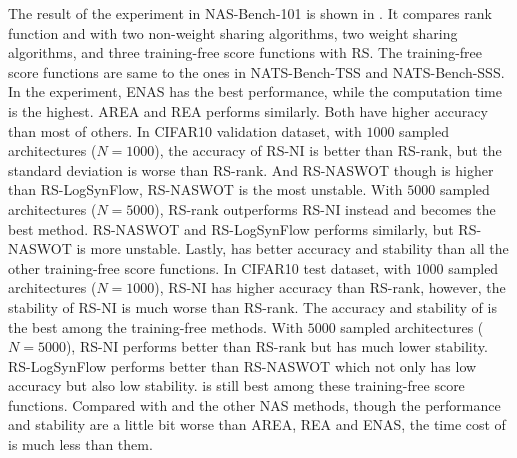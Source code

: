 \documentclass[sigconf]{acmart}
\begin{document}
    The result of the experiment in NAS-Bench-101 \cite{ying2019nasbench101} is shown in . 
    It compares rank function and \palg{} with two non-weight sharing algorithms, two weight 
    sharing algorithms, and three training-free score functions with RS. The training-free 
    score functions are same to the ones in NATS-Bench-TSS and NATS-Bench-SSS. In the experiment, ENAS has 
    the best performance, while the computation time is the highest. AREA and REA performs similarly. 
    Both have higher accuracy than most of others. 
    In CIFAR10 validation dataset, with $1000$ sampled architectures ($N=1000$), the accuracy of 
    RS-NI is better than RS-rank, but the standard deviation is worse than RS-rank. And RS-NASWOT 
    though is higher than RS-LogSynFlow, RS-NASWOT is the most unstable. With $5000$ sampled architectures 
    ($N=5000$), RS-rank outperforms RS-NI instead and becomes the best method. RS-NASWOT and RS-LogSynFlow
    performs similarly, but RS-NASWOT is more unstable. Lastly, \palg{} has better accuracy 
    and stability than all the other training-free score functions. In CIFAR10 test dataset, with $1000$ 
    sampled architectures ($N=1000$), RS-NI has higher accuracy than RS-rank, however, the stability of 
    RS-NI is much worse than RS-rank. The accuracy and stability of \palg{} is the best among the 
    training-free methods. With $5000$ sampled architectures ($N=5000$), RS-NI performs better than 
    RS-rank but has much lower stability. RS-LogSynFlow performs better than RS-NASWOT which not only 
    has low accuracy but also low stability. \palg{} is still best among these training-free score 
    functions. Compared with \palg{} and the other NAS methods, though the performance and stability 
    are a little bit worse than AREA, REA and ENAS, the time cost of \palg{} is much less than them. 
\end{document}
